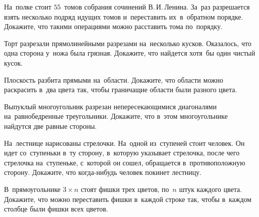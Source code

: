 


\begin{problems}

\item
На~полке стоит $55$~томов собрания сочинений В.\,И.\,Ленина.
За~раз разрешается взять несколько подряд идущих томов и~переставить
их~в~обратном порядке.
Докажите, что такими операциями можно расставить тома по~порядку.


\item
Торт разрезали прямолинейными разрезами на~несколько кусков.
Оказалось, что одна сторона у~ножа была грязная.
Докажите, что найдется хотя~бы один чистый кусок.

\item
Плоскость разбита прямыми на~области.
Докажите, что области можно раскрасить в~два цвета так, чтобы граничащие
области были разного цвета.

\item
Выпуклый многоугольник разрезан непересекающимися диагоналями на~равнобедренные
треугольники.
Докажите, что в~этом многоугольнике найдутся две равные стороны.

\item
На~лестнице нарисованы стрелочки.
На~одной из~ступеней стоит человек.
Он идет со~ступеньки в~ту сторону, в~которую указывает стрелочка, после чего
стрелочка на~ступеньке, с~которой он сошел, обращается в~противоположную
сторону.
Докажите, что когда-нибудь человек покинет лестницу.

\item
В~прямоугольнике $3 \times n$ стоят фишки трех цветов, по~$n$ штук каждого
цвета.
Докажите, что можно переставить фишки в~каждой строке так, чтобы в~каждом
столбце были фишки всех цветов.



\end{problems}
